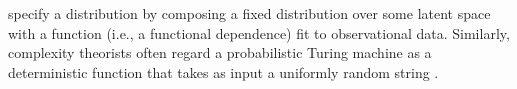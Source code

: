     \citep{tabak2010density,Kobyzev_2021}
    specify a distribution
    by composing a fixed
    distribution
    over some latent space
    with a function (i.e., a functional dependence) fit to observational data.
Similarly, complexity theorists often regard
    a probabilistic Turing machine as a deterministic function
    that takes as input a uniformly random string \citep{probTuring}.
%
